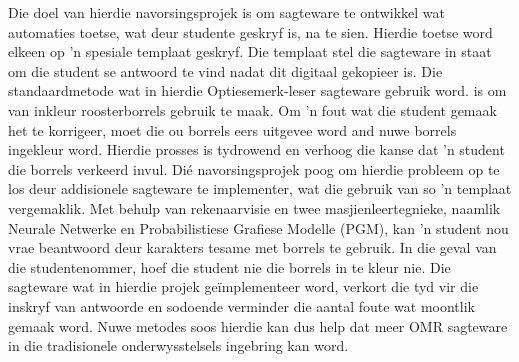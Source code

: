 
\begin{uittreksel}    %
Die doel van hierdie navorsingsprojek is om sagteware te ontwikkel wat automaties toetse, wat deur studente geskryf is, na te sien. Hierdie toetse word elkeen op 'n spesiale templaat geskryf. Die templaat stel die sagteware in staat om die student se antwoord te vind nadat dit digitaal gekopieer is. Die standaardmetode wat in hierdie Optiesemerk-leser sagteware gebruik word. is om van inkleur roosterborrels gebruik te maak. Om 'n fout wat die student gemaak het te korrigeer, moet die ou borrels eers uitgevee word and nuwe borrels ingekleur word. Hierdie prosses is tydrowend en verhoog die kanse dat 'n student die borrels verkeerd invul. Dié navorsingsprojek poog om hierdie probleem op te los deur addisionele sagteware te implementer, wat die gebruik van so 'n templaat vergemaklik. Met behulp van rekenaarvisie en twee masjienleertegnieke, naamlik Neurale Netwerke en Probabilistiese Grafiese Modelle (PGM), kan 'n student nou vrae beantwoord deur karakters tesame met borrels te gebruik. In die geval van die studentenommer, hoef die student nie die borrels in te kleur nie. Die sagteware wat in hierdie projek geïmplementeer word, verkort die tyd vir die inskryf van antwoorde en sodoende verminder die aantal foute wat moontlik gemaak word. Nuwe metodes soos hierdie kan dus help dat meer OMR sagteware in die tradisionele onderwysstelsels ingebring kan word.
\end{uittreksel}
